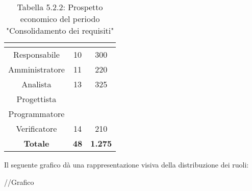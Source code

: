 \renewcommand{\arraystretch}{1.5}
\begin{table}[H]
\begin{center}
\begin{tabular}{|c|c|c|}
\hline
\rowcolor{title_row}
\textbf{\color{title_text}{Ruolo}}  & \textbf{\color{title_text}{Ore}} & \textbf{\color{title_text}{Costo in \euro}} \\ \hline
Responsabile    & 10 & 300 \\ \hline
Amministratore  & 11 & 220 \\ \hline
Analista        & 13 & 325 \\ \hline
Progettista     & & \\ \hline
Programmatore   & & \\ \hline
Verificatore    & 14 & 210 \\ \hline
\textbf{Totale} & \textbf{48}    & \textbf{1.275}    \\ \hline
\end{tabular}
\caption{Tabella 5.2.2: Prospetto economico del periodo "Consolidamento dei requisiti"\label{}}
\end{center}
\end{table}
\renewcommand{\arraystretch}{1}

Il seguente grafico dà una rappresentazione visiva della distribuzione dei ruoli: \\
\begin{center}
//Grafico
\end{center}

\pagebreak
